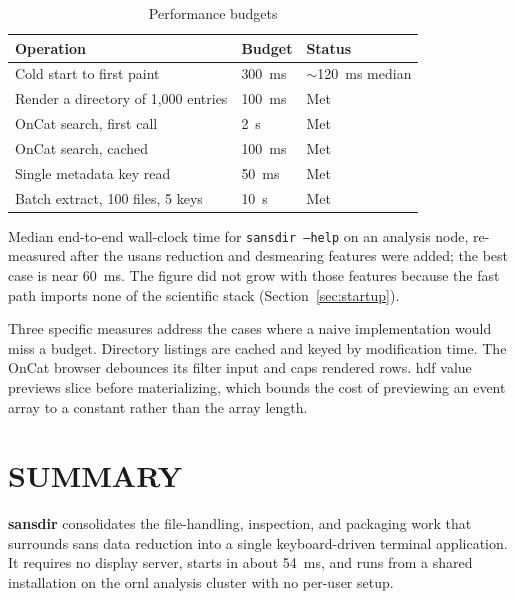 \documentclass[tm]{ornltm}
\begin{document}
\begin{table}[ht]
  \centering
  \begin{threeparttable}
  \caption{Performance budgets}
  \label{tab:perf}
  \small
  \begin{tabular}{p{} l l}
    \toprule
    Operation & Budget & Status \\
    \midrule
    Cold start to first paint & 300~ms & $\sim$120~ms median\tnote{a} \\
    Render a directory of 1,000 entries & 100~ms & Met \\
    OnCat search, first call & 2~s & Met \\
    OnCat search, cached & 100~ms & Met \\
    Single metadata key read & 50~ms & Met \\
    Batch extract, 100 files, 5 keys & 10~s & Met \\
    \bottomrule
  \end{tabular}
  \begin{tablenotes}
    \item[a] Median end-to-end wall-clock time for \texttt{sansdir --help} on
    an analysis node, re-measured after the \ac{usans} reduction and desmearing
    features were added; the best case is near 60~ms. The figure did not grow
    with those features because the fast path imports none of the scientific
    stack (Section~\ref{sec:startup}).
  \end{tablenotes}
  \end{threeparttable}
\end{table}

Three specific measures address the cases where a naive implementation would
miss a budget. Directory listings are cached and keyed by modification time.
The OnCat browser debounces its filter input and caps rendered rows. \Ac{hdf}
value previews slice before materializing, which bounds the cost of previewing an
event array to a constant rather than the array length.

\section{SUMMARY}
\label{sec:future}

\textbf{sansdir} consolidates the file-handling, inspection, and packaging work
that surrounds \ac{sans} data reduction into a single keyboard-driven terminal
application. It requires no display server, starts in about 54~ms, and runs from
a shared installation on the \ac{ornl} analysis cluster with no per-user setup.
\end{document}
